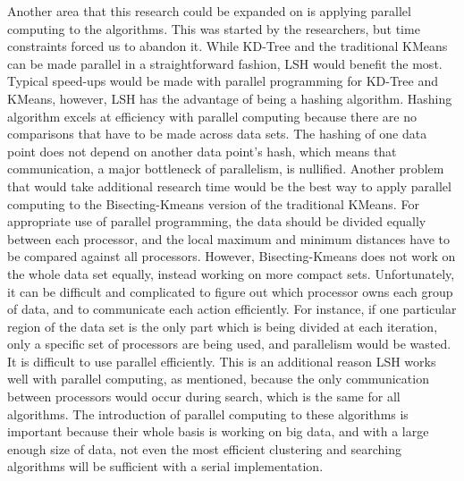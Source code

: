 \documentclass[journal]{IEEEtran}
\begin{document}
Another area that this research could be expanded on is applying parallel computing to the algorithms. This was started by the researchers, but time constraints forced us to abandon it. While KD-Tree and the traditional KMeans can be made parallel in a straightforward fashion, LSH would benefit the most. Typical speed-ups would be made with parallel programming for KD-Tree and KMeans, however, LSH has the advantage of being a hashing algorithm. Hashing algorithm excels at efficiency with parallel computing because there are no comparisons that have to be made across data sets. The hashing of one data point does not depend on another data point's hash, which means that communication, a major bottleneck of parallelism, is nullified. Another problem that would take additional research time would be the best way to apply parallel computing to the Bisecting-Kmeans version of the traditional KMeans. For appropriate use of parallel programming, the data should be divided equally between each processor, and the local maximum and minimum distances have to be compared against all processors. However, Bisecting-Kmeans does not work on the whole data set equally, instead working on more compact sets. Unfortunately, it can be difficult and complicated to figure out which processor owns each group of data, and to communicate each action efficiently. For instance, if one particular region of the data set is the only part which is being divided at each iteration, only a specific set of processors are being used, and parallelism would be wasted. It is difficult to use parallel efficiently. This is an additional reason LSH works well with parallel computing, as mentioned, because the only communication between processors would occur during search, which is the same for all algorithms. The introduction of parallel computing to these algorithms is important because their whole basis is working on big data, and with a large enough size of data, not even the most efficient clustering and searching algorithms will be sufficient with a serial implementation. 
\end{document}
